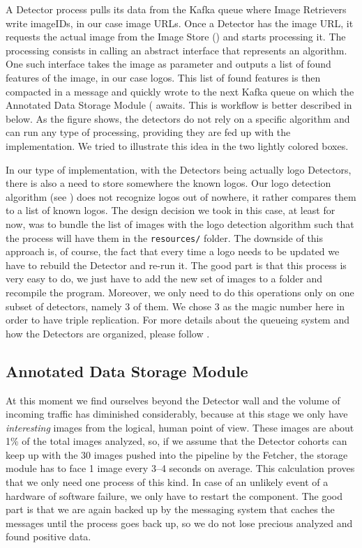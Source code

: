 A Detector process pulls its data from the Kafka queue where Image Retrievers
write imageIDs, in our case image URLs. Once a Detector has the image URL, it
requests the actual image from the Image Store
() and starts processing it. The
processing consists in calling an abstract interface that represents an
algorithm. One such interface takes the image as parameter and outputs a list
of found features of the image, in our case logos. This list of found features
is then compacted in a message and quickly wrote to the next Kafka queue on
which the Annotated Data Storage Module
( awaits. This is workflow is
better described in  below. As the figure
shows, the detectors do not rely on a specific algorithm and can
run any type of processing, providing they are fed up with the implementation.
We tried to illustrate this idea in the two lightly colored boxes.

In our type of implementation, with the Detectors being actually logo
Detectors, there is also a need to store somewhere the known logos. Our logo
detection algorithm (see ) does not
recognize logos out of nowhere, it rather compares them to a list of known
logos. The design decision we took in this case, at least for now, was to
bundle the list of images with the logo detection algorithm such that the
process will have them in the \texttt{resources/} folder. The downside of this
approach is, of course, the fact that every time a logo needs to be updated we
have to rebuild the Detector and re-run it. The good part is that this process
is very easy to do, we just have to add the new set of images to a folder
and recompile the program. Moreover, we only need to do this operations only
on one subset of detectors, namely 3 of them. We chose 3 as the magic number
here in order to have triple replication. For more details about the queueing
system and how the Detectors are organized, please follow
.

\subsection{Annotated Data Storage Module}
\label{sub-sec:ads-module}

At this moment we find ourselves beyond the Detector wall and the volume of
incoming traffic has diminished considerably, because at this stage we only
have \textit{interesting} images from the logical, human point of view. These
images are about 1\% of the total images analyzed, so, if we assume that the
Detector cohorts can keep up with the 30 images pushed into the pipeline by
the Fetcher, the storage module has to face 1 image every 3--4 seconds on
average. This calculation proves that we only need one process of this kind.
In case of an unlikely event of a hardware of software failure, we only have
to restart the component. The good part is that we are again backed up by the
messaging system that caches the messages until the process goes back up, so
we do not lose precious analyzed and found positive data.

